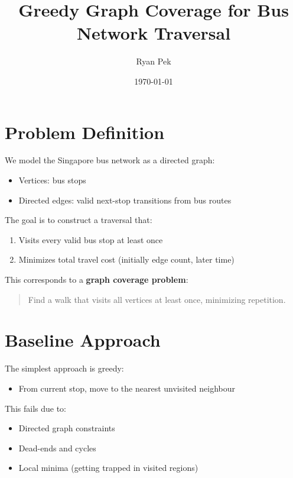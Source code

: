 \documentclass[11pt]{article}
\title{Greedy Graph Coverage for Bus Network Traversal}
\author{Ryan Pek}
\date{\today}
\begin{document}
\maketitle

\section{Problem Definition}

We model the Singapore bus network as a directed graph:

\begin{itemize}
    \item Vertices: bus stops
    \item Directed edges: valid next-stop transitions from bus routes
\end{itemize}

The goal is to construct a traversal that:

\begin{enumerate}
    \item Visits every valid bus stop at least once
    \item Minimizes total travel cost (initially edge count, later time)
\end{enumerate}

This corresponds to a \textbf{graph coverage problem}:

\begin{quote}
Find a walk that visits all vertices at least once, minimizing repetition.
\end{quote}

\section{Baseline Approach}

The simplest approach is greedy:

\begin{itemize}
    \item From current stop, move to the nearest unvisited neighbour
\end{itemize}

This fails due to:

\begin{itemize}
    \item Directed graph constraints
    \item Dead-ends and cycles
    \item Local minima (getting trapped in visited regions)
\end{itemize}
\end{document}
